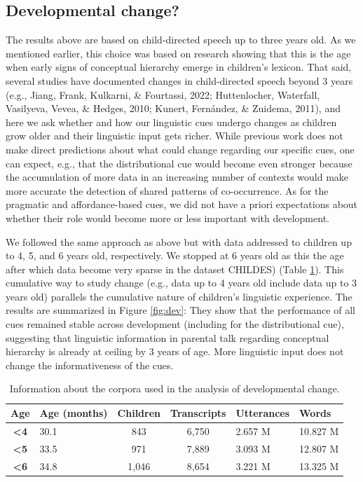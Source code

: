 \documentclass[english,,man]{apa6}
\begin{document}
\hypertarget{developmental-change}{%
\subsection{Developmental change?}\label{developmental-change}}

The results above are based on child-directed speech up to three years old. As we mentioned earlier, this choice was based on research showing that this is the age when early signs of conceptual hierarchy emerge in children's lexicon. That said, several studies have documented changes in child-directed speech beyond 3 years (e.g., Jiang, Frank, Kulkarni, \& Fourtassi, 2022; Huttenlocher, Waterfall, Vasilyeva, Vevea, \& Hedges, 2010; Kunert, Fernández, \& Zuidema, 2011), and here we ask whether and how our linguistic cues undergo changes as children grow older and their linguistic input gets richer. While previous work does not make direct predictions about what could change regarding our specific cues, one can expect, e.g., that the distributional cue would become even stronger because the accumulation of more data in an increasing number of contexts would make more accurate the detection of shared patterns of co-occurrence. As for the pragmatic and affordance-based cues, we did not have a priori expectations about whether their role would become more or less important with development.

We followed the same approach as above but with data addressed to children up to 4, 5, and 6 years old, respectively. We stopped at 6 years old as this the age after which data become very sparse in the dataset CHILDES) (Table \ref{tab:development}). This cumulative way to study change (e.g., data up to 4 years old include data up to 3 years old) parallels the cumulative nature of children's linguistic experience. The results are summarized in Figure \ref{fig:dev}: They show that the performance of all cues remained stable across development (including for the distributional cue), suggesting that linguistic information in parental talk regarding conceptual hierarchy is already at ceiling by 3 years of age. More linguistic input does not change the informativeness of the cues.

\begin{table}[!htbp] \centering 
\caption{\label{tab:development} Information about the corpora used in the analysis of developmental change.}
\begin{tabularx}{\linewidth}{cXccXX}

\textbf{Age} & Age (months) & Children & Transcripts & Utterances & Words \\
\hline

\textbf{\textless4} & 30.1 & 843 & 6,750 & 2.657 M & 10.827 M\\

\textbf{\textless5} & 33.5 & 971 & 7,889 & 3.093 M & 12.807 M\\

\textbf{\textless6} & 34.8 & 1,046 & 8,654 & 3.221 M & 13.325 M\\

\hline
\end{tabularx}

\end{table}
\end{document}
